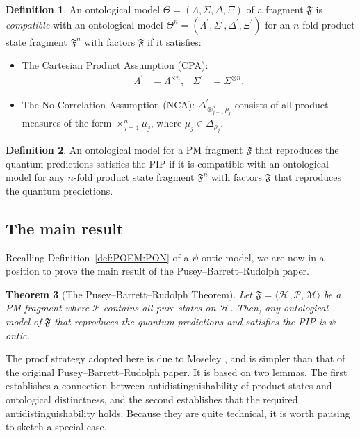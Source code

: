 \documentclass[DIV=calc,paper=a4,fontsize=11pt,twocolumn]{scrartcl} %
\theoremstyle{definition}
\newtheorem{definition}{Definition}[section]
\theoremstyle{plain}
\newtheorem{theorem}[definition]{Theorem}
\newcommand{\Hilb}[1][]{\ensuremath{\mathcal{H}_{#1}}}
\begin{document}
\begin{definition}
An ontological model $\Theta = (\Lambda, \Sigma, \Delta, \Xi)$ of a
fragment $\mathfrak{F}$ is \emph{compatible} with an ontological
model $\Theta^n = (\Lambda^{\prime}, \Sigma^{\prime},
\Delta^{\prime}, \Xi^{\prime})$ for an $n$-fold product state
fragment $\mathfrak{F}^n$ with factors $\mathfrak{F}$ if it
satisfies:
\begin{itemize}
\item The Cartesian Product Assumption (CPA):
\begin{align}
\Lambda^{\prime} & = \Lambda^{\times n}, & \Sigma^{\prime} & =
\Sigma^{\otimes n}.
\end{align}
\item The No-Correlation Assumption (NCA):
$\Delta^{\prime}_{\otimes_{j=1}^n \rho_j}$ consists of all product
measures of the form $\times_{j=1}^n\mu_j$, where $\mu_j \in
\Delta_{\rho_j}$.
\end{itemize}
\end{definition}

\begin{definition}
An ontological model for a PM fragment $\mathfrak{F}$ that
reproduces the quantum predictions satisfies the PIP if it is
compatible with an ontological model for any $n$-fold product state
fragment $\mathfrak{F}^n$ with factors $\mathfrak{F}$ that
reproduces the quantum predictions.
\end{definition}

\subsection{The main result}

\label{Main}

Recalling Definition~\ref{def:POEM:PON} of a $\psi$-ontic model, we
are now in a position to prove the main result of the Pusey--Barrett--Rudolph paper.

\begin{theorem}[The Pusey--Barrett--Rudolph Theorem]
\label{thm:Main:Pusey--Barrett--Rudolph}
Let $\mathfrak{F} = \langle \Hilb, \mathcal{P}, \mathcal{M} \rangle$
be a PM fragment where $\mathcal{P}$ contains all
pure states on $\Hilb$.  Then, any ontological model of
$\mathfrak{F}$ that reproduces the quantum predictions and satisfies
the PIP is $\psi$-ontic.
\end{theorem}

The proof strategy adopted here is due to Moseley \cite{Moseley2014},
and is simpler than that of the original Pusey--Barrett--Rudolph paper.  It is based on
two lemmas.  The first establishes a connection between
antidistinguishability of product states and ontological distinctness,
and the second establishes that the required antidistinguishability
holds.  Because they are quite technical, it is worth pausing to
sketch a special case.
\end{document}
